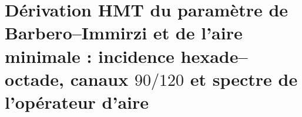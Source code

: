 \HMTFlushCurrentChapter
\chapter{Dérivation HMT du paramètre de Barbero--Immirzi et de l'aire minimale : incidence hexade--octade, canaux \(90/120\) et spectre de l'opérateur d'aire}%
\begingroup
\renewcommand{\chapter}[2][]{}%
%
\endgroup


\HMTFlushCurrentChapter


\HMTFlushCurrentChapter
\chapter{Classification généalogique des nombres : sections survivantes, invariants et atlas de constantes}%
\begingroup
\renewcommand{\chapter}[2][]{}%
%
\endgroup

\HMTFlushCurrentChapter
\chapter{Complétude généalogique des sections HMT et décidabilité de chaque niveau fini}%
\begingroup
\renewcommand{\chapter}[2][]{}%
%
\endgroup

\HMTFlushCurrentChapter
\chapter{Obstruction de Gödel--Turing à la décision uniforme des multiplicités projectives}%
\begingroup
\renewcommand{\chapter}[2][]{}%
%
\endgroup

